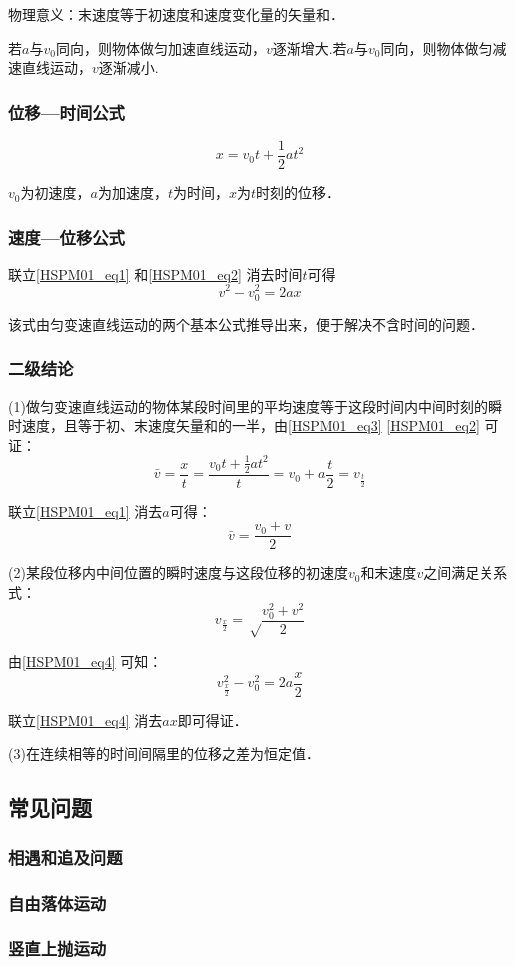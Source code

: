 物理意义：末速度等于初速度和速度变化量的矢量和．

若$a$与$v_0$同向，则物体做匀加速直线运动，$v$逐渐增大.若$a$与$v_0$同向，则物体做匀减速直线运动，$v$逐渐减小.

\subsubsection{位移—时间公式}
\begin{equation}\label{HSPM01_eq2}
x=v_0 t+\frac12at^2
\end{equation}

$v_0$为初速度，$a$为加速度，$t$为时间，$x$为$t$时刻的位移．

\subsubsection{速度—位移公式}
联立\autoref{HSPM01_eq1} 和\autoref{HSPM01_eq2} 消去时间$t$可得
\begin{equation}\label{HSPM01_eq4}
v^2-v_0^2=2ax
\end{equation}

该式由匀变速直线运动的两个基本公式推导出来，便于解决不含时间的问题．

\subsubsection{二级结论}
(1)做匀变速直线运动的物体某段时间里的平均速度等于这段时间内中间时刻的瞬时速度，且等于初、末速度矢量和的一半，由\autoref{HSPM01_eq3} \autoref{HSPM01_eq2} 可证：
\begin{equation}
\bar v=\frac xt=\frac{v_0t+\frac 12at^2}{t}=v_0+a\frac t2=v_{\frac t2}
\end{equation}

联立\autoref{HSPM01_eq1} 消去$a$可得：
\begin{equation}
\bar v=\frac{v_0+v}{2}
\end{equation}

(2)某段位移内中间位置的瞬时速度与这段位移的初速度$v_0$和末速度$v$之间满足关系式：
\begin{equation}
v_\frac x2=\sqrt \frac{v_0^2+v^2}2
\end{equation}

由\autoref{HSPM01_eq4} 可知：
\begin{equation}
v_{\frac x2}^2-v_0^2=2a\frac x2
\end{equation}

联立\autoref{HSPM01_eq4} 消去$ax$即可得证．

(3)在连续相等的时间间隔里的位移之差为恒定值．

\subsection{常见问题}
\subsubsection{相遇和追及问题}
\subsubsection{自由落体运动}
\subsubsection{竖直上抛运动}